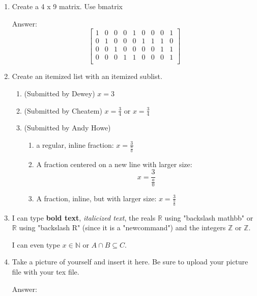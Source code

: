 \documentclass{article}
\begin{document}
\begin{enumerate}
\begin{enumerate}
\item
Create a 4 x 9 matrix. Use bmatrix

Answer:
$$\begin{bmatrix}
    1 & 0 & 0 & 0 & 1 & 0 & 0 & 0 & 1 \\
    0 & 1 & 0 & 0 & 0 & 1 & 1 & 1 & 0 \\
    0 & 0 & 1 & 0 & 0 & 0 & 0 & 1 & 1 \\
    0 & 0 & 0 & 1 & 1 & 0 & 0 & 0 & 1 \\
    \end{bmatrix}$$
    
\item
Create an itemized list with an itemized sublist.

    \begin{enumerate}
        \item (Submitted by Dewey) $x=3$
        \item (Submitted by Cheatem) $x=\frac{3}{4}$ or $x=\frac{3}{4}$
        \item (Submitted by Andy Howe)
        \begin{enumerate}
            \item a regular, inline fraction: $x=\frac{3}{\frac{a}{0}}$
            \item A fraction centered on a new line with larger size:
            \large$$x=\frac{3}{\frac{a}{0}}$$
            \item A fraction, inline, but with larger size: \large$x=\frac{3}{\frac{a}{0}}$
    \end{enumerate}
   \end{enumerate}

    
\item I can type \textbf{bold text}, \textit{italicized text}, the reals $\mathbb{R}$ using "backslash mathbb" or $\mathbb{R}$ using "backslash R" (since it is a "newcommand") and the integers $\mathbb{Z}$ or $\mathbb{Z}$.

I can even type $x\in\mathbb{N}$ or $A\cap B\subseteq C$.

\item Take a picture of yourself and insert it here. Be sure to upload your picture file with your tex file.

Answer:


\end{enumerate}
\end{enumerate}
\end{document}
